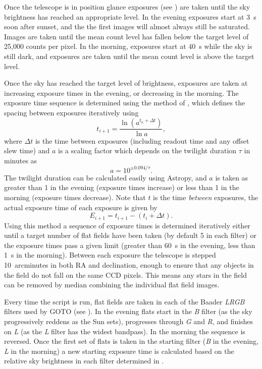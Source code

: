 \begin{colsection}
\begin{colsection}
Once the telescope is in position glance exposures (see ) are taken until the sky brightness has reached an appropriate level. In the evening exposures start at \SI{3}{\second} soon after sunset, and the the first images will almost always still be saturated. Images are taken until the mean count level has fallen below the target level of 25,000 counts per pixel. In the morning, exposures start at \SI{40}{\second} while the sky is still dark, and exposures are taken until the mean count level is above the target level.

Once the sky has reached the target level of brightness, exposures are taken at increasing exposure times in the evening, or decreasing in the morning. The exposure time sequence is determined using the method of \citet{flats3}, which defines the spacing between exposures iteratively using
%
\begin{equation}
    t_{i+1} = \frac{\ln{(a^{t_n+\Delta t})}}{\ln{a}},
    \label{eq:sky}
\end{equation}
%
where $\Delta t$ is the time between exposures (including readout time and any offset slew time) and $a$ is a scaling factor which depends on the twilight duration $\tau$ in minutes as
%
\begin{equation}
    a = 10^{\pm 0.094/\tau}.
    \label{eq:sky2}
\end{equation}
%
The twilight duration can be calculated easily using Astropy, and $a$ is taken as greater than 1 in the evening (exposure times increase) or less than 1 in the morning (exposure times decrease). Note that $t$ is the time \emph{between} exposures, the actual exposure time of each exposure is given by
%
\begin{equation}
    E_{i+1} = t_{i+1} - (t_i + \Delta t).
    \label{eq:sky3}
\end{equation}
%
Using this method a sequence of exposure times is determined iteratively either until a target number of flat fields have been taken (by default 5 in each filter) or the exposure times pass a given limit (greater than \SI{60}{\second} in the evening, less than \SI{1}{\second} in the morning). Between each exposure the telescope is stepped 10~arcminutes in both RA and declination, enough to ensure that any objects in the field do not fall on the same CCD pixels. This means any stars in the field can be removed by median combining the individual flat field images.

Every time the script is run, flat fields are taken in each of the Baader \textit{LRGB} filters used by GOTO (see ). In the evening flats start in the \textit{B} filter (as the sky progressively reddens as the Sun sets), progresses through \textit{G} and \textit{R}, and finishes on \textit{L} (as the \textit{L} filter has the widest bandpass). In the morning the sequence is reversed. Once the first set of flats is taken in the starting filter (\textit{B} in the evening, \textit{L} in the morning) a new starting exposure time is calculated based on the relative sky brightness in each filter determined in .


\end{colsection}
\end{colsection}
